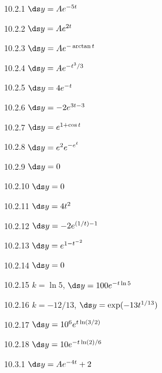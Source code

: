 \begin{Answer}{10.2.1}
 $\ds y=Ae^{-5t}$
\end{Answer}
\begin{Answer}{10.2.2}
 $\ds y=Ae^{2t}$
\end{Answer}
\begin{Answer}{10.2.3}
 $\ds y=Ae^{-\arctan t}$
\end{Answer}
\begin{Answer}{10.2.4}
 $\ds y=Ae^{-t^3/3}$
\end{Answer}
\begin{Answer}{10.2.5}
 $\ds y=4e^{-t}$
\end{Answer}
\begin{Answer}{10.2.6}
 $\ds y=-2e^{3t-3}$
\end{Answer}
\begin{Answer}{10.2.7}
 $\ds y=e^{1+\cos t}$
\end{Answer}
\begin{Answer}{10.2.8}
 $\ds y=e^2e^{-e^t}$
\end{Answer}
\begin{Answer}{10.2.9}
 $\ds y=0$
\end{Answer}
\begin{Answer}{10.2.10}
 $\ds y=0$
\end{Answer}
\begin{Answer}{10.2.11}
 $\ds y=4t^2$
\end{Answer}
\begin{Answer}{10.2.12}
 $\ds y=-2e^{(1/t)-1}$
\end{Answer}
\begin{Answer}{10.2.13}
 $\ds y=e^{1-t^{-2}}$
\end{Answer}
\begin{Answer}{10.2.14}
 $\ds y=0$
\end{Answer}
\begin{Answer}{10.2.15}
 $k=\ln 5$, $\ds y=100e^{-t\ln 5}$
\end{Answer}
\begin{Answer}{10.2.16}
 $k=-12/13$, $\ds y=\exp(-13 t^{1/13})$
\end{Answer}
\begin{Answer}{10.2.17}
 $\ds y=10^6e^{t\ln(3/2)}$
\end{Answer}
\begin{Answer}{10.2.18}
 $\ds y=10e^{-t\ln(2)/6}$
\end{Answer}
\begin{Answer}{10.3.1}
 $\ds y=Ae^{-4t}+2$
\end{Answer}
